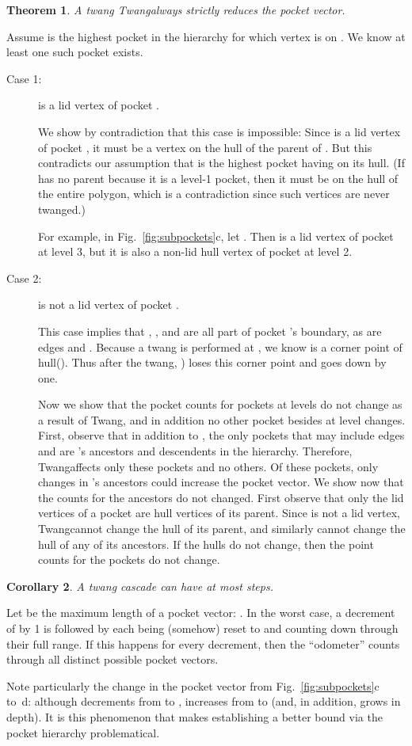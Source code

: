 \pdfoutput=1  \documentclass{article}
\def\tw{{\sc Twang}}
\newtheorem{theorem}{{\bf Theorem}}
\newtheorem{corollary}[theorem]{Corollary}
\newcommand{\corlab}[1]{\label{cor:#1}}
\newcommand{\figref}[1]{\ref{fig:#1}}
\newcommand{\ABox}{
\raisebox{3pt}{\framebox[6pt]{\rule{6pt}{0pt}}}
}
\newenvironment{pf}{{\bf Proof:}}{\hfill\ABox}
\begin{document}
\begin{theorem}
A twang \tw always strictly reduces the pocket vector.
\end{theorem}
\begin{pf}
Assume  is the highest pocket in the hierarchy for which 
vertex  is on . 
We know at least one such pocket exists.   

\begin{description}
\item[Case 1:]
 is a lid vertex of pocket .

We show by contradiction that this case is impossible: Since  is a lid 
vertex of pocket , it must be a vertex on the hull of the parent of 
. But this contradicts our assumption that  is the highest 
pocket having  on its hull. (If  has no parent because it is a level-1 
pocket, then it must be on the hull of the entire polygon, which is a 
contradiction since such vertices are never twanged.)

For example, in Fig.~\figref{subpockets}c,
let . Then 
is a lid vertex of pocket  at level 3, 
but it is also a non-lid hull vertex of pocket  at level 2.

\item[Case 2:]
 is not a lid vertex of pocket .

This case implies that , , and  are all part of pocket 's 
boundary, as are edges  and . Because a twang is performed at , we 
know  is a corner point of hull(). Thus after the twang, ) 
loses this corner point and  goes down by one.

Now we show that the pocket counts for pockets at levels  do not change 
as a result of \tw, and in addition no other pocket besides  
at level  changes. First, observe that in addition to , the only 
pockets that may include edges  and  are 's ancestors and 
descendents in the hierarchy. Therefore, \tw affects only these 
pockets and no others.  Of these pockets, only changes in 's 
ancestors could increase the pocket vector. We show now that the counts for the 
ancestors do not changed. First observe that only the lid vertices of a 
pocket are hull vertices of its parent. Since  is not a lid vertex, 
\tw cannot change the hull of its parent, and similarly cannot 
change the hull of any of its ancestors. If the hulls do not change, then 
the point counts for the pockets do not change.
\end{description}
\end{pf}

\begin{corollary}
A twang cascade can have at most  steps.
\corlab{odometer}
\end{corollary}
\begin{pf}
Let  be the maximum length of a pocket vector:
.
In the worst case, a decrement of  by 1 is followed
by  each being (somehow) reset to  and counting down
through their full range.
If this happens for every decrement, then
the ``odometer'' counts through all  distinct possible pocket vectors.
\end{pf}

Note particularly the change in the pocket vector from 
Fig.~\figref{subpockets}c to~d: although  decrements
from  to ,  increases from  to 
(and, in addition,  grows in depth).
It is this phenomenon that makes establishing a better bound
via the pocket hierarchy problematical.
\end{document}

